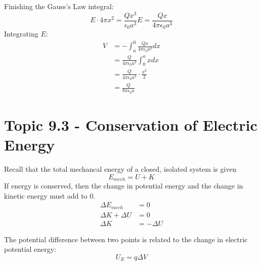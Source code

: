 \documentclass[12pt, titlepage]{article}
\begin{document}
\begin{Problem}
    Finishing the Gauss's Law integral:
    \begin{equation*}
        E \cdot 4 \pi x^2 = \frac{Qx^3}{\epsilon_0 a^3}
        E = \frac{Qx}{4 \pi \epsilon_0 a^3}
    \end{equation*}
    Integrating $E$:
    \begin{equation*}
        \begin{split}
            V &= -\int_{a}^{0} \frac{Qx}{4 \pi \epsilon_0 a^3} dx \\
            & = \frac{Q}{4 \pi \epsilon_0 a^3} \int_{0}^{a} x dx \\
            & = \frac{Q}{4 \pi \epsilon_0 a^3} \cdot \frac{x^2}{2} \\
            & = \frac{Q}{8 \pi \epsilon_0 a}
        \end{split}
    \end{equation*}
\end{Problem}

\section*{Topic 9.3 - Conservation of Electric Energy}

Recall that the total mechancal energy of a closed, isolated system is given 
\begin{equation*}
    E_{mech} = U + K
\end{equation*}
If energy is conserved, then the change in potential energy and the change in kinetic energy must add to 0. 
\begin{equation*}
    \begin{split}
        \Delta E_{mech} &= 0 \\
        \Delta K + \Delta U &= 0 \\
        \Delta K &= -\Delta U
    \end{split}
\end{equation*}

The potential difference between two points is related to the change in electric potential energy:
\begin{equation*}
    U_E = q\Delta V
\end{equation*}
\end{document}
